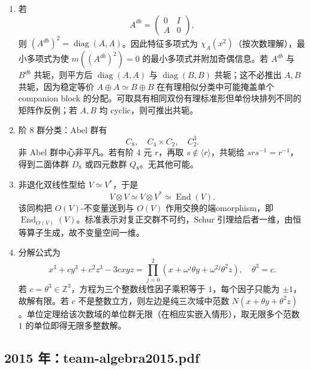 \documentclass[UTF8,12pt]{ctexart}
\begin{document}
\begin{enumerate}[label=\textbf{\arabic*.},leftmargin=2.2em]
一般 \(p\) 为奇素数时，利用
\[
\prod_{n=1}^{p-1}\left(1-\zeta^{2n}\right)=p
\]
可得标准正弦乘积公式
\[
\prod_{n=1}^{(p-1)/2}\sin\frac{n\pi}{p}=\frac{\sqrt p}{2^{(p-1)/2}}.
\]
又
\[
\sin\frac{2n\pi}{p}=2\sin\frac{n\pi}{p}\cos\frac{n\pi}{p}.
\]
由于 \(1\le n\le (p-1)/2\) 时有 \(0<2n\pi/p<\pi\)，左边全为正；同时集合 \(\{2n\bmod p:1\le n\le (p-1)/2\}\) 经由恒等式 \(\sin((p-r)\pi/p)=\sin(r\pi/p)\) 化回后，正好给出 \(\{1,\ldots,(p-1)/2\}\) 的一个排列。因此
\[
\prod_{n=1}^{(p-1)/2}\sin\frac{2n\pi}{p}
=\prod_{n=1}^{(p-1)/2}\sin\frac{n\pi}{p}.
\]
两边相除得
\[
2^{(p-1)/2}\prod_{n=1}^{(p-1)/2}\cos\frac{n\pi}{p}=1.
\]
因此
\[
\prod_{n=1}^{(p-1)/2}\cos\frac{n\pi}{p}
=\frac{1}{2^{(p-1)/2}},
\]
这是有理数，并给出了其值。
\item 若
\[
A^{db}=\begin{pmatrix}0&I\\ A&0\end{pmatrix},
\]
则 \((A^{db})^2=\operatorname{diag}(A,A)\)。因此特征多项式为 \(\chi_A(x^2)\)（按次数理解），最小多项式为使 \(m((A^{db})^2)=0\) 的最小多项式并附加奇偶信息。若 \(A^{db}\) 与 \(B^{db}\) 共轭，则平方后 \(\operatorname{diag}(A,A)\) 与 \(\operatorname{diag}(B,B)\) 共轭；这不必推出 \(A,B\) 共轭，因为稳定等价 \(A\oplus A\simeq B\oplus B\) 在有理相似分类中可能掩盖单个 companion block 的分配。可取具有相同双份有理标准形但单份块排列不同的矩阵作反例；若 \(A,B\) 均 cyclic，则可推出共轭。
\item 阶 \(8\) 群分类：Abel 群有
\[
C_8,\quad C_4\times C_2,\quad C_2^3.
\]
非 Abel 群中心非平凡。若有阶 \(4\) 元 \(r\)，再取 \(s\notin\langle r\rangle\)，共轭给 \(srs^{-1}=r^{-1}\)，得到二面体群 \(D_8\) 或四元数群 \(Q_8\)。无其他可能。
\item 非退化双线性型给 \(V\simeq V^\ast\)，于是
\[
V\otimes V\simeq V\otimes V^\ast\simeq \operatorname{End}(V).
\]
该同构把 \(O(V)\)-不变量送到与 \(O(V)\) 作用交换的端omorphism，即 \(\operatorname{End}_{O(V)}(V)\)。标准表示对复正交群不可约，Schur 引理给后者一维，由恒等算子生成，故不变量空间一维。
\item 分解公式为
\[
x^3+cy^3+c^2z^3-3cxyz=\prod_{j=0}^2(x+\omega^j\theta y+\omega^{2j}\theta^2 z),\quad \theta^3=c.
\]
若 \(c=\theta^3\in\mathbb Z^3\)，方程为三个整数线性因子乘积等于 \(1\)，每个因子只能为 \(\pm1\)，故解有限。若 \(c\) 不是整数立方，则左边是纯三次域中范数 \(N(x+\theta y+\theta^2z)\)。单位定理给该次数域的单位群无限（在相应实嵌入情形），取无限多个范数 \(1\) 的单位即得无限多整数解。
\end{enumerate}

\subsection{2015 年：team-algebra2015.pdf}
\end{document}
